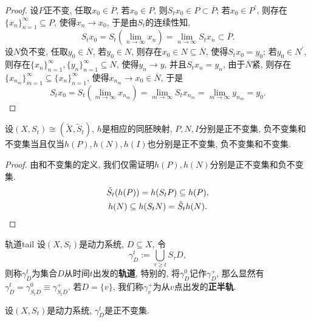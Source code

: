 \begin{proof}
	设$P$正不变, 任取$x_{0}\in \overline{P}$, 若$x_{0}\in P$, 则$S_{t}x_{0}\in P\subset \overline{P}$; 若$x_{0}\in P^{\prime}$, 则存在$\{x_{n}\}_{n=1}^{\infty}\subseteq P$, 使得$x_{n}\to x_{0}$, 于是由$S_{t}$的连续性知, $$
	S_{t}x_{0}=S_{t}\left(\lim_{n\to\infty}x_{n}\right)=\lim_{n\to\infty}S_{t}x_{n}\subset \overline{P}.$$
	设$N$负不变, 任取$y_{0}\in \overline{N}$, 若$y_{0}\in N$, 则存在$x_{0}\in N\subseteq \overline{N}$, 使得$S_{t}x_{0}=y_{0}$; 若$y_{0}\in N^{\prime}$, 则存在$\{x_{n}\}_{n=1}^{\infty},\{y_{n}\}_{n=1}^{\infty}\subseteq N$, 使得$y_{n}\to y$, 并且$S_{t}x_{n}=y_{n}$, 由于$\overline{N}$紧, 则存在$\{x_{n_{m}}\}_{m=1}^{\infty}\subseteq \{x_{n}\}_{n=1}^{\infty}$, 使得$x_{n_{m}}\to x_{0}\in \overline{N}$, 于是$$
	S_{t}x_{0}=S_{t}\left(\lim_{m\to\infty}x_{n_{m}}\right)=\lim_{m\to\infty}S_{t}x_{n_{m}}=\lim_{m\to\infty}y_{n_{m}}=y_{0}.$$
\end{proof}

\begin{exercise}
	设$(X,S_{t})\cong(\tilde{X},\tilde{S}_{t})$, $h$是相应的同胚映射, $P, N, I$分别是正不变集, 负不变集和不变集当且仅当$h(P),h(N),h(I)$也分别是正不变集, 负不变集和不变集.
\end{exercise}

\begin{proof}
	由和不变集的定义, 我们仅需证明$h(P),h(N)$分别是正不变集和负不变集.\begin{gather}
		\tilde{S}_{t}(h(P))=h(S_{t}P)\subseteq h(P),\notag\\h(N)\subseteq h(S_{t}N)=\tilde{S}_{t}h(N).\notag
	\end{gather}
\end{proof}

\begin{definition}{轨道}{tail}
	设$(X,S_{t})$是动力系统, $D\subseteq X$, 令$$
	\gamma^{t}_{D}:=\bigcup_{\tau\geqslant t}S_{\tau}D,$$则称$\gamma^{t}_{D}$为集合$D$从时间$t$出发的\textbf{轨道}, 特别的, 将$\gamma_{D}^{0}$记作$\gamma_{D}^{+}$, 那么显然有$\gamma_{D}^{t}=\gamma_{S_{t}D}^{0}\equiv\gamma_{S_{t}D}^{+}$. 若$D=\{v\}$, 我们称$\gamma_{v}^{+}$为从$v$点出发的\textbf{正半轨}.
\end{definition}

\begin{exercise}
	设$(X,S_{t})$是动力系统, $\gamma_{D}^{t}$是正不变集.
\end{exercise}

